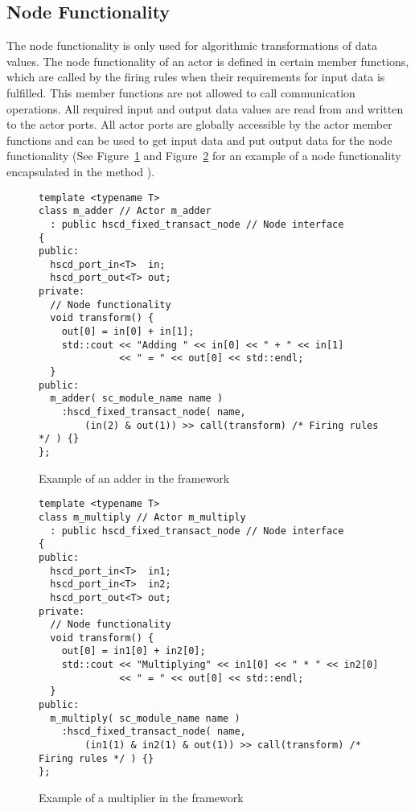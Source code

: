 \subsection{Node Functionality}
The node functionality is only used for algorithmic transformations of data values.
The node functionality of an actor is defined in certain member functions,
which are called by the firing rules when their requirements for input data is fulfilled.
This member functions are not allowed to call communication operations. All required
input and output data values are read from
and written to the actor ports. All actor ports are globally accessible
by the actor member functions and can be used to get input data
and put output data for the node functionality
(See Figure~\ref{example-adder-actor} and Figure~\ref{example-multiply-actor}
 for an example of a node functionality encapsulated in the method ).

\begin{figure}[h]
\centering
\begin{verbatim}
template <typename T>
class m_adder // Actor m_adder
  : public hscd_fixed_transact_node // Node interface
{
public:
  hscd_port_in<T>  in;
  hscd_port_out<T> out;
private:
  // Node functionality
  void transform() {
    out[0] = in[0] + in[1];
    std::cout << "Adding " << in[0] << " + " << in[1]
              << " = " << out[0] << std::endl;
  }
public:
  m_adder( sc_module_name name )
    :hscd_fixed_transact_node( name,
        (in(2) & out(1)) >> call(transform) /* Firing rules */ ) {}
};
\end{verbatim}
\caption{\label{example-adder-actor}Example of an adder in the \SysteMoC{} framework}
\end{figure}

\begin{figure}[h]
\centering
\begin{verbatim}
template <typename T>
class m_multiply // Actor m_multiply
  : public hscd_fixed_transact_node // Node interface
{
public:
  hscd_port_in<T>  in1;
  hscd_port_in<T>  in2;
  hscd_port_out<T> out;
private:
  // Node functionality
  void transform() {
    out[0] = in1[0] + in2[0];
    std::cout << "Multiplying" << in1[0] << " * " << in2[0]
              << " = " << out[0] << std::endl;
  }
public:
  m_multiply( sc_module_name name )
    :hscd_fixed_transact_node( name,
        (in1(1) & in2(1) & out(1)) >> call(transform) /* Firing rules */ ) {}
};
\end{verbatim}
\caption{\label{example-multiply-actor}Example of a multiplier in the \SysteMoC{} framework}
\end{figure}

